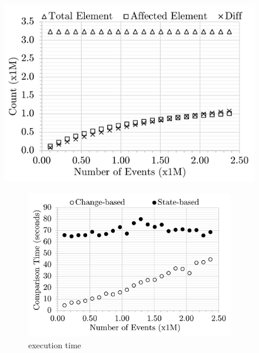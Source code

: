 \documentclass{jot}
\begin{document}
    \begin{figure}
        \vspace{-35pt}
        \includegraphics[width=\linewidth]{mixed-count-events}
        \caption{total elements, affected elements, and diffs}
        \label{fig:modification_course}
        \begin{subfigure}[t]{\linewidth}
            \includegraphics[width=\linewidth]{mixed-time-events}
            \caption{execution time}
            \label{fig:time_diffs}
        \end{subfigure}
        \begin{subfigure}[t]{\linewidth}

\end{subfigure}
\end{figure}
\end{document}

